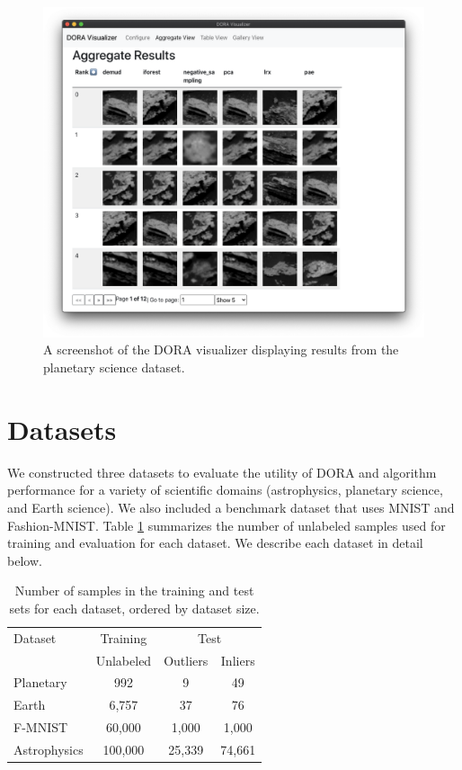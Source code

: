 \documentclass[utf8]{frontiersFPHY} %
\begin{document}
\begin{figure}
  \centering
  \includegraphics[width=0.83\linewidth]{figures/doravis.png}
  \caption{A screenshot of the DORA visualizer displaying results from the
  planetary science dataset.}
  \label{fig:doravis}
\end{figure}


\section{Datasets}
We constructed three datasets to evaluate the utility of DORA and 
algorithm performance for a variety of scientific domains
(astrophysics, planetary science, and Earth science). We also included a 
benchmark dataset that uses MNIST and Fashion-MNIST. Table \ref{tab:datasets}
summarizes the number of unlabeled samples used for training and evaluation for
each dataset. We describe each dataset in detail below.

\begin{table}
\caption{Number of samples in the training and test sets for each dataset,
ordered by dataset size.}
\label{tab:datasets}
\centering
\begin{tabular}{l|c|cc}
  \hline
  Dataset & Training & \multicolumn{2}{c}{Test}\\
   & Unlabeled &  Outliers &  Inliers \\
  
  \hline
  Planetary & 992 &  9 & 49 \\
  Earth & 6,757 & 37 & 76  \\
  F-MNIST & 60,000 & 1,000 & 1,000  \\
  Astrophysics & 100,000   &  25,339 &  74,661 \\
  \hline
\end{tabular}
\end{table}
\end{document}
